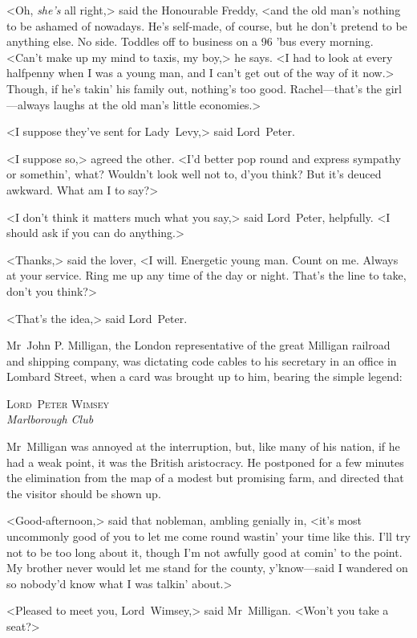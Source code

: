 <Oh, \emph{she's} all right,> said the Honourable Freddy, <and the old man's nothing to be ashamed of nowadays. He's self-made, of course, but he don't pretend to be anything else. No side. Toddles off to business on a 96 'bus every morning. <Can't make up my mind to taxis, my boy,> he says. <I had to look at every halfpenny when I was a young man, and I can't get out of the way of it now.> Though, if he's takin' his family out, nothing's too good. Rachel—that's the girl—always laughs at the old man's little economies.>

<I suppose they've sent for Lady~Levy,> said Lord~Peter.

<I suppose so,> agreed the other. <I'd better pop round and express sympathy or somethin', what? Wouldn't look well not to, d'you think? But it's deuced awkward. What am I to say?>

<I don't think it matters much what you say,> said Lord~Peter, helpfully. <I should ask if you can do anything.>

<Thanks,> said the lover, <I will. Energetic young man. Count on me. Always at your service. Ring me up any time of the day or night. That's the line to take, don't you think?>

<That's the idea,> said Lord~Peter.

Mr~John P\@. Milligan, the London representative of the great Milligan railroad and shipping company, was dictating code cables to his secretary in an office in Lombard Street, when a card was brought up to him, bearing the simple legend:

\begin{center}
\textsc{Lord~Peter Wimsey}\\
\textit{Marlborough Club}
\end{center}

Mr~Milligan was annoyed at the interruption, but, like many of his nation, if he had a weak point, it was the British aristocracy. He postponed for a few minutes the elimination from the map of a modest but promising farm, and directed that the visitor should be shown up.

<Good-afternoon,> said that nobleman, ambling genially in, <it's most uncommonly good of you to let me come round wastin' your time like this. I'll try not to be too long about it, though I'm not awfully good at comin' to the point. My brother never would let me stand for the county, y'know—said I wandered on so nobody'd know what I was talkin' about.>

<Pleased to meet you, Lord~Wimsey,> said Mr~Milligan. <Won't you take a seat?>

